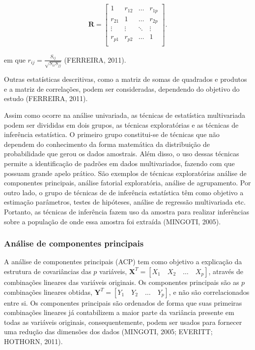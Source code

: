 \documentclass[12pt, a4paper,brazil,oneside]{article}
\begin{document}
	\begin{align*}
	\boldsymbol{R} =
	\left[
	\begin{array}{cccc}
	1      & r_{12} & \dots  & r_{1p} \\
	r_{21} & 1 & \dots  & r_{2p} \\
	\vdots & \vdots & \ddots & \vdots \\
	r_{p1} & r_{p2} & \dots  & 1\\
	\end{array}
	\right].
	\end{align*}        
	
	\noindent em que $r_{ij} = \frac{S_{ij}}{\sqrt{S_{ii} S_{jj}}}$ (FERREIRA, 2011).  
	
	\vspace{0.15cm} %
	
	Outras estatísticas descritivas, como a matriz de somas de quadrados e produtos e a matriz de correlações, podem ser consideradas, dependendo do objetivo do estudo (FERREIRA, 2011).
	
	Assim como ocorre na análise univariada, as técnicas de estatística multivariada podem ser divididas em dois grupos, as técnicas exploratórias e as técnicas de inferência estatística. O primeiro grupo constitui-se de técnicas que não dependem do conhecimento da forma matemática da distribuição de probabilidade que gerou os dados amostrais. Além disso, o uso dessas técnicas permite a identificação de padrões em dados multivariados, fazendo com que possuam grande apelo prático. São exemplos de técnicas exploratórias análise de componentes principais, análise fatorial exploratória, análise de agrupamento. Por outro lado, o grupo de técnicas de de inferência estatística têm como objetivo a estimação  parâmetros, testes de hipóteses, análise de regressão multivariada etc.  Portanto, as técnicas de inferência fazem uso da amostra para realizar inferências sobre a população de onde essa amostra foi extraída (MINGOTI, 2005).
	
	
	\subsubsection{Análise de componentes principais} \label{ACP} 
	
	A análise de componentes principais (ACP) tem como objetivo a explicação da estrutura de covariâncias das $p$ variáveis, $\boldsymbol{X}^T = [X_1 \quad X_2 \quad \dots \quad X_p]$, através de combinações lineares das variáveis originais. Os componentes principais são as $p$ combinações lineares obtidas, $\boldsymbol{Y}^T = [Y_1 \quad Y_2 \quad \dots \quad Y_p]$, e não são correlacionados entre si. Os componentes principais são ordenados de forma que suas primeiras combinações lineares já contabilizem a maior parte da variância presente em todas as variáveis originais, consequentemente, podem ser usados para fornecer uma redução das dimensões dos dados (MINGOTI, 2005; EVERITT; HOTHORN, 2011).
	
\end{document}
